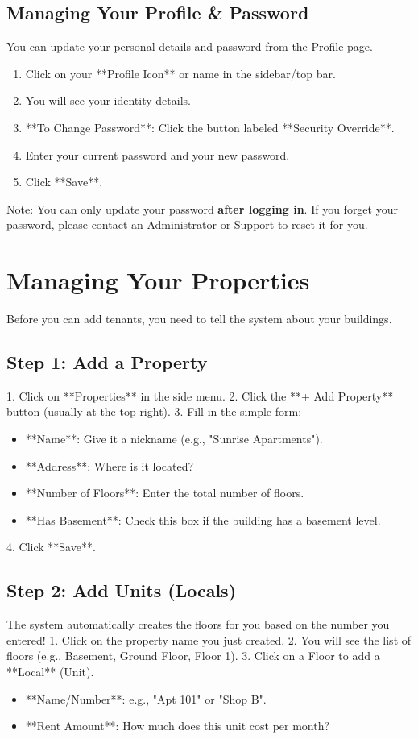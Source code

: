 \documentclass[12pt,a4paper]{article}
\begin{document}
\subsection{Managing Your Profile \& Password}
You can update your personal details and password from the Profile page.
\begin{enumerate}
    \item Click on your **Profile Icon** or name in the sidebar/top bar.
    \item You will see your identity details.
    \item **To Change Password**: Click the button labeled **Security Override**.
    \item Enter your current password and your new password.
    \item Click **Save**.
\end{enumerate}

\begin{tipbox}
    Note: You can only update your password \textbf{after logging in}. If you forget your password, please contact an Administrator or Support to reset it for you.
\end{tipbox}

\section{Managing Your Properties}
Before you can add tenants, you need to tell the system about your buildings.

\subsection{Step 1: Add a Property}
1. Click on **Properties** in the side menu.
2. Click the **+ Add Property** button (usually at the top right).
3. Fill in the simple form:
   \begin{itemize}
       \item **Name**: Give it a nickname (e.g., "Sunrise Apartments").
       \item **Address**: Where is it located?
       \item **Number of Floors**: Enter the total number of floors.
       \item **Has Basement**: Check this box if the building has a basement level.
   \end{itemize}
4. Click **Save**.

\subsection{Step 2: Add Units (Locals)}
The system automatically creates the floors for you based on the number you entered!
1. Click on the property name you just created.
2. You will see the list of floors (e.g., Basement, Ground Floor, Floor 1).
3. Click on a Floor to add a **Local** (Unit).
   \begin{itemize}
       \item **Name/Number**: e.g., "Apt 101" or "Shop B".
       \item **Rent Amount**: How much does this unit cost per month?
   \end{itemize}
\end{document}
